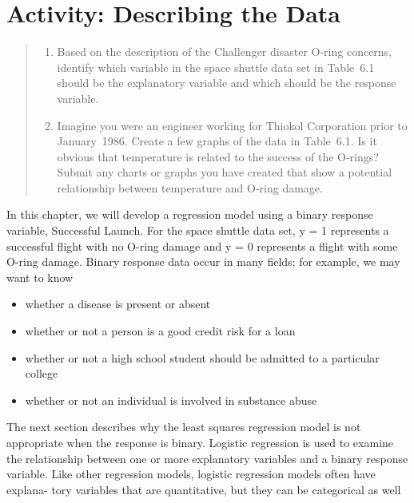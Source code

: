 \documentclass[
]{report}
\providecommand{\tightlist}{%
  \setlength{\itemsep}{0pt}\setlength{\parskip}{0pt}}
\begin{document}
\hypertarget{activity-describing-the-data-1}{%
\section*{Activity: Describing the Data}\label{activity-describing-the-data-1}}

\begin{quote}
\begin{enumerate}
\def\labelenumi{\arabic{enumi}.}
\tightlist
\item
  Based on the description of the Challenger disaster O‑ring concerns, identify which variable in the space shuttle data set in Table~6.1 should be the explanatory variable and which should be the response variable.\\
\item
  Imagine you were an engineer working for Thiokol Corporation prior to January~1986. Create a few graphs of the data in Table~6.1. Is it obvious that temperature is related to the success of the O‑rings? Submit any charts or graphs you have created that show a potential relationship between temperature and O‑ring damage.
\end{enumerate}
\end{quote}

In this chapter, we will develop a regression model using a binary response variable, Successful Launch. For
the space shuttle data set, y = 1 represents a successful flight with no O-ring damage and y = 0 represents a
flight with some O-ring damage. Binary response data occur in many fields; for example, we may want to know

\begin{itemize}
\tightlist
\item
  whether a disease is present or absent
\item
  whether or not a person is a good credit risk for a loan
\item
  whether or not a high school student should be admitted to a particular college
\item
  whether or not an individual is involved in substance abuse
\end{itemize}

The next section describes why the least squares regression model is not appropriate when the response is
binary. Logistic regression is used to examine the relationship between one or more explanatory variables
and a binary response variable. Like other regression models, logistic regression models often have explana-
tory variables that are quantitative, but they can be categorical as well
\end{document}
